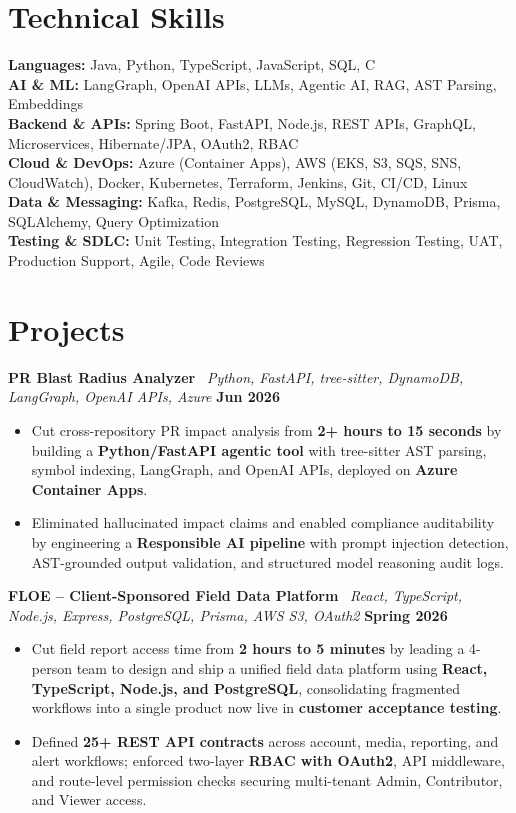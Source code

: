 \documentclass[10pt,letterpaper]{article}
\begin{document}
\section*{Technical Skills}
{\fontsize{8.5}{8.95}\selectfont
\textbf{Languages:} Java, Python, TypeScript, JavaScript, SQL, C\\
\textbf{AI \& ML:} LangGraph, OpenAI APIs, LLMs, Agentic AI, RAG, AST Parsing, Embeddings\\
\textbf{Backend \& APIs:} Spring Boot, FastAPI, Node.js, REST APIs, GraphQL, Microservices, Hibernate/JPA, OAuth2, RBAC\\
\textbf{Cloud \& DevOps:} Azure (Container Apps), AWS (EKS, S3, SQS, SNS, CloudWatch), Docker, Kubernetes, Terraform, Jenkins, Git, CI/CD, Linux\\
\textbf{Data \& Messaging:} Kafka, Redis, PostgreSQL, MySQL, DynamoDB, Prisma, SQLAlchemy, Query Optimization\\
\textbf{Testing \& SDLC:} Unit Testing, Integration Testing, Regression Testing, UAT, Production Support, Agile, Code Reviews
}
\vspace{2pt}

\section*{Projects}
\textbf{PR Blast Radius Analyzer}
\textbar\ \textit{Python, FastAPI, tree-sitter, DynamoDB, LangGraph, OpenAI APIs, Azure}
\hfill \textbf{Jun 2026}
\begin{itemize}
  \item Cut cross-repository PR impact analysis from \textbf{2+ hours to 15 seconds}
  by building a \textbf{Python/FastAPI agentic tool} with tree-sitter AST parsing,
  symbol indexing, LangGraph, and OpenAI APIs, deployed on \textbf{Azure Container Apps}.
  \item Eliminated hallucinated impact claims and enabled compliance auditability
  by engineering a \textbf{Responsible AI pipeline} with prompt injection detection,
  AST-grounded output validation, and structured model reasoning audit logs.
\end{itemize}
\vspace{2pt}

\textbf{FLOE -- Client-Sponsored Field Data Platform}
\textbar\ \textit{React, TypeScript, Node.js, Express, PostgreSQL, Prisma, AWS S3, OAuth2}
\hfill \textbf{Spring 2026}
\begin{itemize}
  \item Cut field report access time from \textbf{2 hours to 5 minutes} by leading a
  4-person team to design and ship a unified field data platform using \textbf{React,
  TypeScript, Node.js, and PostgreSQL}, consolidating fragmented workflows into a single
  product now live in \textbf{customer acceptance testing}.
  \item Defined \textbf{25+ REST API contracts} across account, media, reporting, and
  alert workflows; enforced two-layer \textbf{RBAC with OAuth2}, API middleware, and
  route-level permission checks securing multi-tenant Admin, Contributor, and Viewer access.
\end{itemize}
\vspace{2pt}
\end{document}

